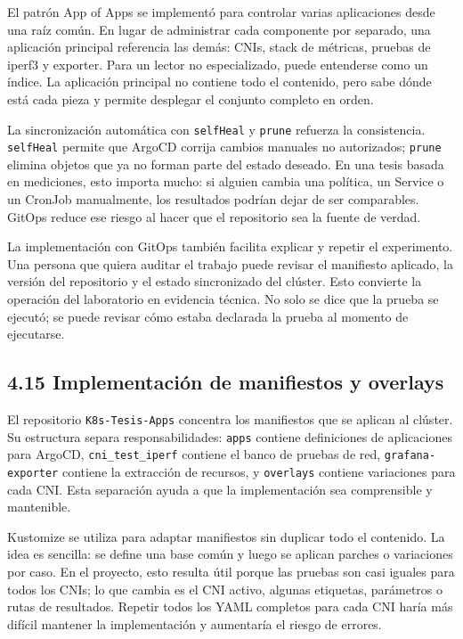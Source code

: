 \documentclass[journal]{IEEEtran}
\begin{document}
El patrón App of Apps se implementó para controlar varias aplicaciones desde una raíz común. En lugar de administrar cada componente por separado, una aplicación principal referencia las demás: CNIs, stack de métricas, pruebas de iperf3 y exporter. Para un lector no especializado, puede entenderse como un índice. La aplicación principal no contiene todo el contenido, pero sabe dónde está cada pieza y permite desplegar el conjunto completo en orden.

La sincronización automática con \texttt{selfHeal} y \texttt{prune} refuerza la consistencia. \texttt{selfHeal} permite que ArgoCD corrija cambios manuales no autorizados; \texttt{prune} elimina objetos que ya no forman parte del estado deseado. En una tesis basada en mediciones, esto importa mucho: si alguien cambia una política, un Service o un CronJob manualmente, los resultados podrían dejar de ser comparables. GitOps reduce ese riesgo al hacer que el repositorio sea la fuente de verdad.

La implementación con GitOps también facilita explicar y repetir el experimento. Una persona que quiera auditar el trabajo puede revisar el manifiesto aplicado, la versión del repositorio y el estado sincronizado del clúster. Esto convierte la operación del laboratorio en evidencia técnica. No solo se dice que la prueba se ejecutó; se puede revisar cómo estaba declarada la prueba al momento de ejecutarse.

\subsection{4.15 Implementación de manifiestos y overlays}

El repositorio \texttt{K8s-Tesis-Apps} concentra los manifiestos que se aplican al clúster. Su estructura separa responsabilidades: \texttt{apps} contiene definiciones de aplicaciones para ArgoCD, \texttt{cni\_test\_iperf} contiene el banco de pruebas de red, \texttt{grafana-exporter} contiene la extracción de recursos, y \texttt{overlays} contiene variaciones para cada CNI. Esta separación ayuda a que la implementación sea comprensible y mantenible.

Kustomize se utiliza para adaptar manifiestos sin duplicar todo el contenido. La idea es sencilla: se define una base común y luego se aplican parches o variaciones por caso. En el proyecto, esto resulta útil porque las pruebas son casi iguales para todos los CNIs; lo que cambia es el CNI activo, algunas etiquetas, parámetros o rutas de resultados. Repetir todos los YAML completos para cada CNI haría más difícil mantener la implementación y aumentaría el riesgo de errores.
\end{document}
